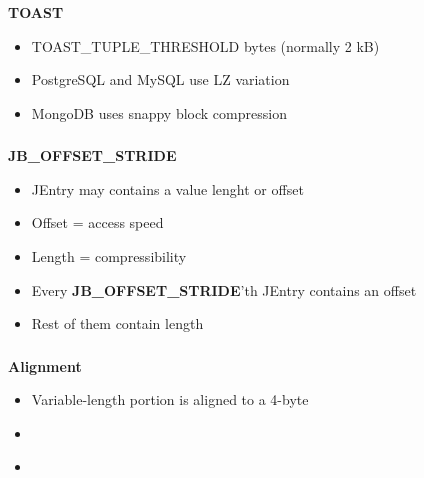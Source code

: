 \documentclass[usenames,dvipsnames, 18pt, compress, aspectratio=169]{beamer}
\begin{document}
\begin{frame}
    \frametitle{}
    \begin{center}
    \textbf{TOAST}
    \vspace{20pt}


    \vspace{20pt}
    \begin{itemize}[label={\MVRightarrow}]
        \item TOAST\_TUPLE\_THRESHOLD bytes (normally 2 kB)
        \item PostgreSQL and MySQL use LZ variation
        \item MongoDB uses snappy block compression
    \end{itemize}

    \end{center}
\end{frame}

\begin{frame}
    \frametitle{}
    \begin{center}
    \textbf{JB\_OFFSET\_STRIDE}

    \begin{itemize}[label={\MVRightarrow}]
        \item JEntry may contains a value lenght or offset
        \item Offset = access speed
        \item Length = compressibility
        \item Every \textbf{JB\_OFFSET\_STRIDE}'th JEntry contains an offset
        \item Rest of them contain length
    \end{itemize}
    \end{center}
\end{frame}

\begin{frame}
    \frametitle{}
    \begin{center}
    \textbf{Alignment}

    \begin{itemize}[label={\MVRightarrow}]
        \item Variable-length portion is aligned to a 4-byte
        \item \inputminted[fontsize=\Large]{sql}{sql/insert_align1.sql}
        \item \inputminted[fontsize=\Large]{sql}{sql/insert_align2.sql}
    \end{itemize}

    \end{center}
\end{frame}
\end{document}
